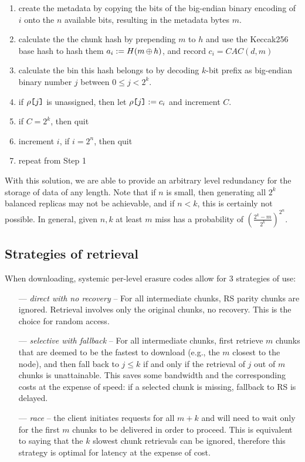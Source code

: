 \begin{enumerate}[noitemsep]
    \item create the metadata by copying the bits of the big-endian binary encoding of $i$ onto the $n$ available bits, resulting in the metadata bytes $m$.
    \item calculate the the chunk hash by prepending      $m$ to $h$ and use the Keccak256 base hash to hash them $a_i:=H(m\operatorname{\operatorname{\oplus}} h)$, and record $c_i=\mathit{CAC}(d,m)$
    \item calculate the bin this hash belongs to by decoding $k$-bit prefix as big-endian binary number $j$ between $0\leq j<2^k$.
    \item if $\rho\texttt{[}\/j\/\texttt{]}$ is unassigned, then let $\rho\texttt{[}\/j\/\texttt{]}:=c_i$ and increment $C$.
    \item if $C=2^k$, then quit
    \item increment $i$, if $i=2^n$, then quit
    \item repeat from Step 1 
\end{enumerate}

With this solution, we are able to provide an arbitrary level redundancy for the storage of data of any length. Note that if $n$ is small, then generating all $2^k$ balanced replicas may not be achievable, and if $n<k$, this is certainly not possible.
In general, given $n, k$ at least $m$ miss has a probability of $\left(\frac{2^k-m}{2^k}\right)^{2^n}$.


\subsection{Strategies of retrieval}
\label{sec:strategies}

When downloading, systemic per-level erasure codes allow for 3 strategies of use:
\begin{itemize}[noitemsep]
      \item[---]
\emph{direct with no recovery}
– For all intermediate chunks, RS parity chunks are ignored. Retrieval involves  only the original chunks, no recovery. This is the choice for random access.
\item[---]
\emph{selective with fallback}
– For all intermediate chunks, first retrieve $ m$ chunks that are deemed to be the fastest to download (e.g., the $m$ closest to the node), and then fall back to $j\leq k$ if and only if the retrieval of $j$ out of $m$ chunks is unattainable. This saves
some bandwidth and the corresponding costs at the expense of speed: if a selected chunk
is missing, fallback to RS is delayed.
\item[---] \emph{race} – the client initiates requests for all $m+k$ and will need to wait only for the first $m$ chunks to be delivered in order to proceed. This is equivalent to saying that the  $k$ slowest chunk retrievals can be ignored, therefore this strategy is optimal for latency at the expense of cost.
\end{itemize}

